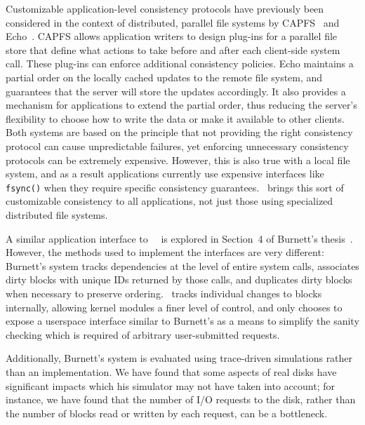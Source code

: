Customizable application-level consistency protocols have previously been
considered in the context of distributed, parallel file systems by
CAPFS~\cite{vilayannur05providing} and Echo~\cite{mann94coherent}.
%
CAPFS allows application writers to design plug-ins for a parallel file store
that define what actions to take before and after each client-side system
call.
%
These plug-ins can enforce additional consistency policies.
%
Echo maintains a partial order on the locally cached updates to the remote file
system, and guarantees that the server will store the updates accordingly. It
also provides a mechanism for applications to extend the partial order, thus
reducing the server's flexibility to choose how to write the data or make it
available to other clients.
%
Both systems are based on the principle that not providing the right
consistency protocol can cause unpredictable failures, yet enforcing
unnecessary consistency protocols can be extremely expensive.
%
However, this is also true with a local file system, and as a result
applications currently use expensive interfaces like \texttt{fsync()} when
they require specific consistency guarantees.
%
\Kudos\ brings this sort of customizable consistency to all applications, not
just those using specialized distributed file systems.

A similar application interface to \Kudos\ \patchgroups\ is explored in
Section~4 of Burnett's thesis~\cite{burnett06information}. However, the methods
used to implement the interfaces are very different: Burnett's system tracks
dependencies at the level of entire system calls, associates dirty blocks with
unique IDs returned by those calls, and duplicates dirty blocks when necessary
to preserve ordering. \Kudos\ tracks individual changes to blocks internally,
allowing kernel modules a finer level of control, and only chooses to expose a
userspace interface similar to Burnett's as a means to simplify the sanity
checking which is required of arbitrary user-submitted requests.

Additionally, Burnett's system is evaluated using trace-driven simulations
rather than an implementation. We have found that some aspects of real disks
have significant impacts which his simulator may not have taken into account;
for instance, we have found that the number of I/O requests to the disk, rather
than the number of blocks read or written by each request, can be a bottleneck.



